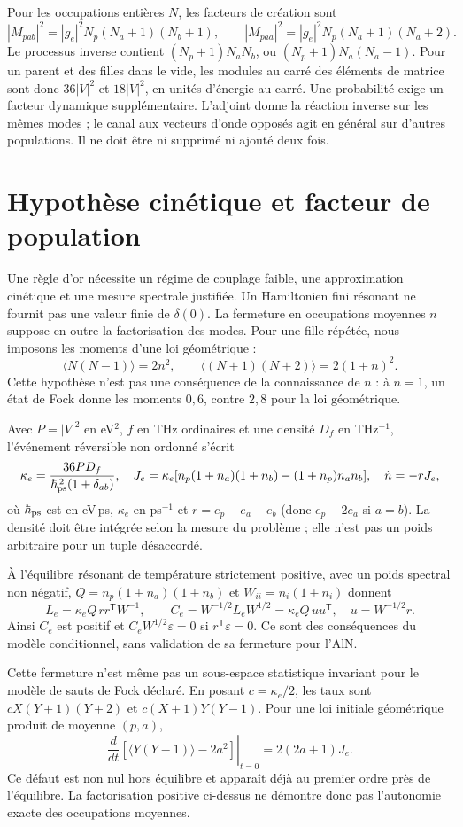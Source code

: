 \documentclass[11pt,a4paper]{article}
\begin{document}
Pour les occupations entières $N$, les facteurs de création sont
\[
 |M_{pab}|^2=|g_e|^2N_p(N_a+1)(N_b+1),\qquad
 |M_{paa}|^2=|g_e|^2N_p(N_a+1)(N_a+2).
\]
Le processus inverse contient $(N_p+1)N_aN_b$, ou
$(N_p+1)N_a(N_a-1)$. Pour un parent et des filles dans le vide,
les modules au carré des éléments de matrice sont donc
$36|V|^2$ et $18|V|^2$, en unités d'énergie au carré.
Une probabilité exige un facteur dynamique supplémentaire.
L'adjoint donne la réaction inverse sur les mêmes modes ; le canal
aux vecteurs d'onde opposés agit en général sur d'autres populations.
Il ne doit être ni supprimé ni ajouté deux fois.

\section{Hypothèse cinétique et facteur de population}
Une règle d'or nécessite un régime de couplage faible, une approximation
cinétique et une mesure spectrale justifiée. Un Hamiltonien fini résonant
ne fournit pas une valeur finie de $\delta(0)$.
La fermeture en occupations moyennes $n$ suppose en outre la
factorisation des modes. Pour une fille répétée, nous imposons les
moments d'une loi géométrique :
\[
 \langle N(N-1)\rangle=2n^2,\qquad
 \langle(N+1)(N+2)\rangle=2(1+n)^2.
\]
Cette hypothèse n'est pas une conséquence de la connaissance de $n$ :
à $n=1$, un état de Fock donne les moments $0,6$, contre $2,8$
pour la loi géométrique.

Avec $P=|V|^2$ en eV$^2$, $f$ en THz ordinaires et une densité
$D_f$ en THz$^{-1}$, l'événement réversible non ordonné s'écrit
\[
 \kappa_e=\frac{36P D_f}{\hbar_{\rm ps}^{\,2}(1+\delta_{ab})},
 \quad
 J_e=\kappa_e[n_p(1+n_a)(1+n_b)-(1+n_p)n_an_b],
 \quad \dot n=-rJ_e,
\]
où $\hbar_{\rm ps}$ est en eV\,ps, $\kappa_e$ en ps$^{-1}$ et
$r=e_p-e_a-e_b$ (donc $e_p-2e_a$ si $a=b$).
La densité doit être intégrée selon la mesure du problème ; elle n'est
pas un poids arbitraire pour un tuple désaccordé.

À l'équilibre résonant de température strictement positive, avec
un poids spectral non négatif, $Q=\bar n_p(1+\bar n_a)(1+\bar n_b)$ et
$W_{ii}=\bar n_i(1+\bar n_i)$ donnent
\[
 L_e=\kappa_e Q\,rr^{\mathsf T}W^{-1},\qquad
 C_e=W^{-1/2}L_eW^{1/2}
     =\kappa_e Q\,uu^{\mathsf T},\quad u=W^{-1/2}r.
\]
Ainsi $C_e$ est positif et $C_eW^{1/2}\varepsilon=0$ si
$r^{\mathsf T}\varepsilon=0$. Ce sont des conséquences du modèle
conditionnel, sans validation de sa fermeture pour l'AlN.

Cette fermeture n'est même pas un sous-espace statistique invariant
pour le modèle de sauts de Fock déclaré. En posant $c=\kappa_e/2$,
les taux sont $cX(Y+1)(Y+2)$ et $c(X+1)Y(Y-1)$. Pour une loi
initiale géométrique produit de moyenne $(p,a)$,
\[
 \left.\frac{d}{dt}
 [\langle Y(Y-1)\rangle-2a^2]\right|_{t=0}
 =2(2a+1)J_e.
\]
Ce défaut est non nul hors équilibre et apparaît déjà au premier ordre
près de l'équilibre. La factorisation positive ci-dessus ne démontre
donc pas l'autonomie exacte des occupations moyennes.
\end{document}
